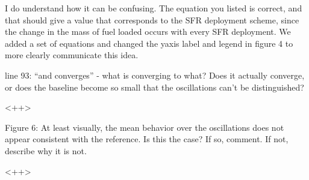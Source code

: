 \documentclass[answers,11pt]{exam}
\begin{document}
\begin{questions}
        \begin{solution}
        I do understand how it can be confusing. The equation you listed
        is correct, and that should give a value that corresponds to the
        SFR deployment scheme, since the change in the mass of fuel loaded
        occurs with every SFR deployment. We added a set of equations
        and changed the yaxis label and legend in figure 4 to
        more clearly communicate this idea.
        \end{solution}


        \question line 93: ``and converges'' - what is converging to what?  
        Does it actually converge, or does the baseline become so small that 
        the oscillations can't be distinguished?

        \begin{solution}
        <++>
        \end{solution}


        \question Figure 6: At least visually, the mean behavior over the 
        oscillations does not appear consistent with the reference.  Is this 
        the case? If so, comment.  If not, describe why it is not.

        \begin{solution}
        <++>
        \end{solution}


\end{questions}


\end{document}
